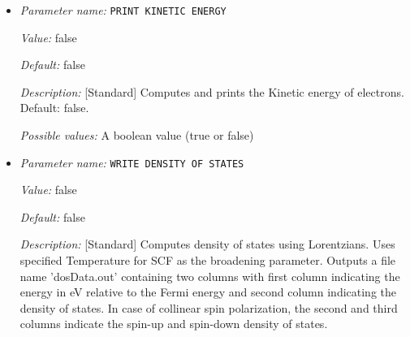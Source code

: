 \begin{itemize}
{\it Value:} false


{\it Default:} false


{\it Description:} [Standard] Writes DFT ground state electron-density solution fields (FEM mesh nodal values) to densityOutput.vtu file for visualization purposes. The electron-density solution field in densityOutput.vtu is named density. In case of spin-polarized calculation, two additional solution fields- density\_0 and density\_1 are also written where 0 and 1 denote the spin indices. In the case of geometry optimization, the electron-density corresponding to the last ground-state solve is written. Default: false.


{\it Possible values:} A boolean value (true or false)

\item {\it Parameter name:} {\tt PRINT KINETIC ENERGY}
\label{parameters:Post_2dprocessing Options/PRINT KINETIC ENERGY}
\label{parameters:Post_2dprocessing_20Options/PRINT_20KINETIC_20ENERGY}


{\it Value:} false


{\it Default:} false


{\it Description:} [Standard] Computes and prints the Kinetic energy of electrons. Default: false.


{\it Possible values:} A boolean value (true or false)

\item {\it Parameter name:} {\tt WRITE DENSITY OF STATES}
\label{parameters:Post_2dprocessing Options/WRITE DENSITY OF STATES}
\label{parameters:Post_2dprocessing_20Options/WRITE_20DENSITY_20OF_20STATES}


{\it Value:} false


{\it Default:} false


{\it Description:} [Standard] Computes density of states using Lorentzians. Uses specified Temperature for SCF as the broadening parameter. Outputs a file name 'dosData.out' containing two columns with first column indicating the energy in eV relative to the Fermi energy and second column indicating the density of states. In case of collinear spin polarization, the second and third columns indicate the spin-up and spin-down density of states.



\end{itemize}
